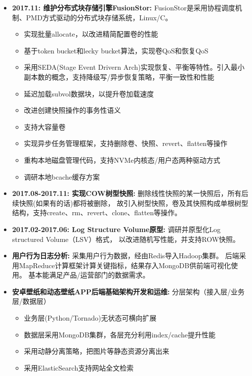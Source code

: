   \begin{itemize}[leftmargin=*]
      \item \textbf{2017.11: 维护分布式块存储引擎FusionStor:} FusionStor是采用协程调度机制、PMD方式驱动的分布式块存储系统，Linux/C。
          {\small
          \begin{itemize}
              \item 实现批量allocate，以改进精简配置卷的性能
              \item 基于token bucket和lecky bucket算法，实现卷QoS和恢复QoS
              \item 采用SEDA(Stage Event Drivern Arch)实现恢复、平衡等特性。引入最小副本数的概念，支持降级写/异步恢复策略，平衡一致性和性能
              \item 延迟加载subvol数据块，以提升卷加载速度
              \item 改进创建快照操作的事务性语义
              \item 支持大容量卷
              \item 实现异步任务管理框架，支持删除卷、快照、revert、flatten等操作
              \item 重构本地磁盘管理代码，支持NVMe内核态/用户态两种驱动方式
              \item 调研本地bcache缓存方案
          \end{itemize}
          }

      \item \textbf{2017.08-2017.11: 实现COW树型快照:} 删除线性快照的某一快照后，所有后续快照(如果有的话)都将被删除，
          故引入树型快照，卷及其快照构成单根树型结构，支持create、rm、revert、clone、flatten等操作。

      \item \textbf{2017.02-2017.06: Log Structure Volume原型:} 调研并原型化Log structured Volume（LSV）格式，
          以改进随机写性能，并支持ROW快照。

      \item \textbf{用户行为日志分析:} 采集用户行为数据，经由Redis导入Hadoop集群。
          后端采用MapReduce计算框架计算关键指标，结果存入MongoDB供前端可视化使用。
          基本能满足产品/运营部门的数据需求。

      \item \textbf{安卓壁纸和动态壁纸APP后端基础架构开发和运维:} 分层架构（接入层/业务层/数据层）
          {\small
          \begin{itemize}
              \item 业务层(Python/Tornado)无状态可横向扩展
              \item 数据层采用MongoDB集群，各层充分利用index/cache提升性能
              \item 采用动静分离策略，把图片等静态资源分离出来
              \item 采用ElasticSearch支持网站全文检索
          \end{itemize}
          }


\end{itemize}
